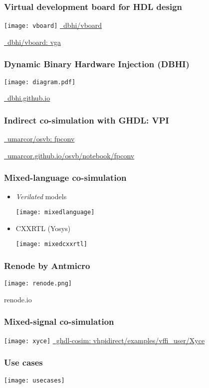 \documentclass[xcolor={usenames,dvipsnames}]{beamer}
\begin{document}
\begin{frame}
\frametitle{Virtual development board for HDL design}
\centering
\vfill
\texttt{[image: vboard]}
\vfill
\Large \href{https://github.com/dbhi/vboard}{\faGithub~dbhi/vboard}

\href{https://github.com/dbhi/vboard/tree/main/vga}{\faCode~dbhi/vboard: vga}
\vfill
\end{frame}

\begin{frame}
\frametitle{Dynamic Binary Hardware Injection (DBHI)}
\centering
\texttt{[image: diagram.pdf]}

\vfill
\Large\href{https://dbhi.github.io/}{\faGlobe~dbhi.github.io}
\end{frame}

\begin{frame}
\frametitle{Indirect co-simulation with GHDL: VPI}
\centering
\Large

\href{https://github.com/umarcor/osvb/tree/main/fpconv}{\faCode~umarcor/osvb: fpconv}

\href{https://umarcor.github.io/osvb/notebook/fpconv.html}{\faGlobe~umarcor.github.io/osvb/notebook/fpconv}

\end{frame}

\begin{frame}
\frametitle{Mixed-language co-simulation}

\begin{itemize}
  \item \emph{Verilated} models

    \vfill
    \texttt{[image: mixedlanguage]}
    \vfill

  \item CXXRTL (Yosys)

    \vfill
    \texttt{[image: mixedcxxrtl]}
    \vfill
\end{itemize}
\end{frame}

\begin{frame}
  \frametitle{Renode by Antmicro}
  \centering
  \texttt{[image: renode.png]}

  \vfill
  \Large
  renode.io
  \href{https://renode.io/}{\faGlobe}
  \href{https://docs.google.com/presentation/d/1j0gjI4pVkgF9CWvxaxr5XuCKakEB25YX2n-iFxlYKnE}{\faSlideshare}
\end{frame}

\begin{frame}
\frametitle{Mixed-signal co-simulation}
\centering
\texttt{[image: xyce]}
\vfill
\Large
\href{https://ghdl.github.io/ghdl-cosim/vhpidirect/examples/vffi_user.html\#xyce}{\faGlobe~ghdl-cosim: vhpidirect/examples/vffi\_user/Xyce}
\end{frame}

\begin{frame}
\frametitle{Use cases}
\centering
\texttt{[image: usecases]}
\end{frame}
\end{document}
